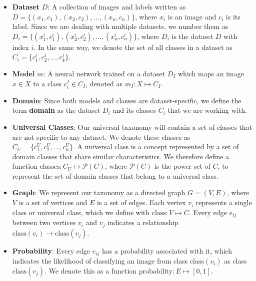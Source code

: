 \begin{itemize}
      \item \textbf{Dataset} $D$: A collection of images and labels
            written as $D = \{(x_1, c_1), (x_2, c_2), \ldots, (x_n, c_n)\}$,
            where $x_i$ is an image and $c_i$ is its label.
            Since we are dealing with multiple datasets, we number them
            as $D_i = \{(x_1^i, c_1^i), (x_2^i, c_2^i), \ldots, (x_n^i, c_n^i)\}$,
            where $D_i$ is the dataset $D$ with index $i$.
            In the same way, we denote the set of all classes in a dataset as $C_i = \{c_1^i, c_2^i, \ldots, c_k^i\}$.
      \item \textbf{Model} $m$: A neural network trained on a dataset $D_I$
            which maps an image $x\in X$ to a class $c_i^I\in C_I$, denoted as $m_I: X \mapsto C_I$.
      \item \textbf{Domain}: Since both models and classes are dataset-specific,
            we define the term \textbf{domain} as the dataset $D_i$ and its classes $C_i$
            that we are working with.
      \item \textbf{Universal Classes}: Our universal taxonomy will contain a set of classes
            that are not specific to any dataset.
            We denote these classes as $C_U = \{c_1^U, c_2^U, \ldots, c_k^U\}$.
            A universal class is a concept represented by a set of domain classes
            that share similar characteristics. We therefore define a function
            $\text{classes}: C_U \mapsto \mathcal{P}(C)$, where $\mathcal{P}(C)$ is the power set of $C$,
            to represent the set of domain classes that belong to a universal class.
      \item \textbf{Graph}: We represent our taxonomy as a directed graph $G = (V, E)$,
            where $V$ is a set of vertices and $E$ is a set of edges.
            Each vertex $v_i$ represents a single class or universal class,
            which we define with $\text{class}: V \mapsto C$.
            Every edge $e_{ij}$ between two vertices $v_i$ and $v_j$ indicates
            a relationship $\text{class}(v_i) \rightarrow \text{class}(v_j)$.
      \item \textbf{Probability}: Every edge $e_{ij}$ has a probability associated with it,
            which indicates the likelihood of classifying an image from class $\text{class}(v_i)$
            as class $\text{class}(v_j)$.
            We denote this as a function $\text{probability}: E \mapsto [0, 1]$.
\end{itemize}

